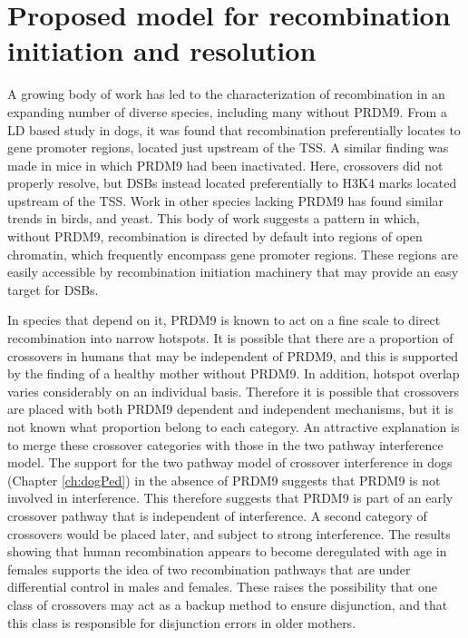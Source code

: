 \section{Proposed model for recombination initiation and resolution}

A growing body of work has led to the characterization of recombination in an expanding number of diverse species, including many without PRDM9.
From a LD based study in dogs, it was found that recombination preferentially locates to gene promoter regions, located just upstream of the TSS\cite{Auton2013}.
A similar finding was made in mice in which PRDM9 had been inactivated\cite{Brick2012}.
Here, crossovers did not properly resolve, but DSBs instead located preferentially to H3K4 marks located upstream of the TSS.
Work in other species lacking PRDM9 has found similar trends in birds\cite{Singhal2015}, and yeast\cite{Lam2015,Nicolas1989}.
This body of work suggests a pattern in which, without PRDM9, recombination is directed by default into regions of open chromatin, which frequently encompass gene promoter regions.
These regions are easily accessible by recombination initiation machinery that may provide an easy target for DSBs.

In species that depend on it, PRDM9 is known to act on a fine scale to direct recombination into narrow hotspots.
It is possible that there are a proportion of crossovers in humans that may be independent of PRDM9, and this is supported by the finding of a healthy mother without PRDM9\cite{Narasimhan2016}.
In addition, hotspot overlap varies considerably on an individual basis\cite{Coop2008,Campbell2015}.
Therefore it is possible that crossovers are placed with both PRDM9 dependent and independent mechanisms, but it is not known what proportion belong to each category.
An attractive explanation is to merge these crossover categories with those in the two pathway interference model.
The support for the two pathway model of crossover interference in dogs (Chapter \ref{ch:dogPed}) in the absence of PRDM9 suggests that PRDM9 is not involved in interference.
This therefore suggests that PRDM9 is part of an early crossover pathway that is independent of interference.
A second category of crossovers would be placed later, and subject to strong interference.
The results showing that human recombination appears to become deregulated with age in females supports the idea of two recombination pathways that are under differential control in males and females.
These raises the possibility that one class of crossovers may act as a backup method to ensure disjunction, and that this class is responsible for disjunction errors in older mothers.

